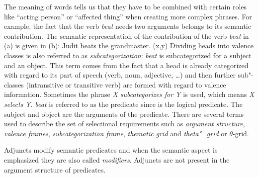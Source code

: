 The meaning of words tells us that they have to be combined with certain roles like ``acting person'' or ``affected thing'' when creating more complex phrases.
For example, the fact that the verb \emph{beat} needs two arguments belongs to its semantic
contribution. The semantic representation of the contribution of the verb \emph{beat} in (a)
is given in (b): 
\eal
\ex Judit beats the grandmaster.
\ex {}(x,y)
\zl
\noindent
Dividing heads into valence classes is also referred to as \emph{subcategorization}:\label{Seite-Subkategoriesierung} 
\emph{beat} is subcategorized for a subject and an object.
This term comes from the fact that a head is already categorized with regard to its
part of speech (verb, noun, adjective, \ldots) and then further sub"-classes (\eg intransitive or
transitive verb) are formed with regard to valence information. Sometimes the phrase \emph{X subcategorizes for Y} is used, which means \emph{X selects Y}.
\emph{beat} is referred to as the predicate since 
 is the logical predicate.
The subject and object are the arguments of the predicate. There are several terms used
to describe the set of selectional requirements such
as \emph{argument structure}, \emph{valence frames},
\emph{subcategorization frame}, \emph{thematic grid}
and \emph{theta"=grid} or $\theta$-grid. 

Adjuncts modify semantic predicates and when the semantic aspect is emphasized they are
also called \emph{modifiers}. Adjuncts are not present in the argument structure
of predicates.


